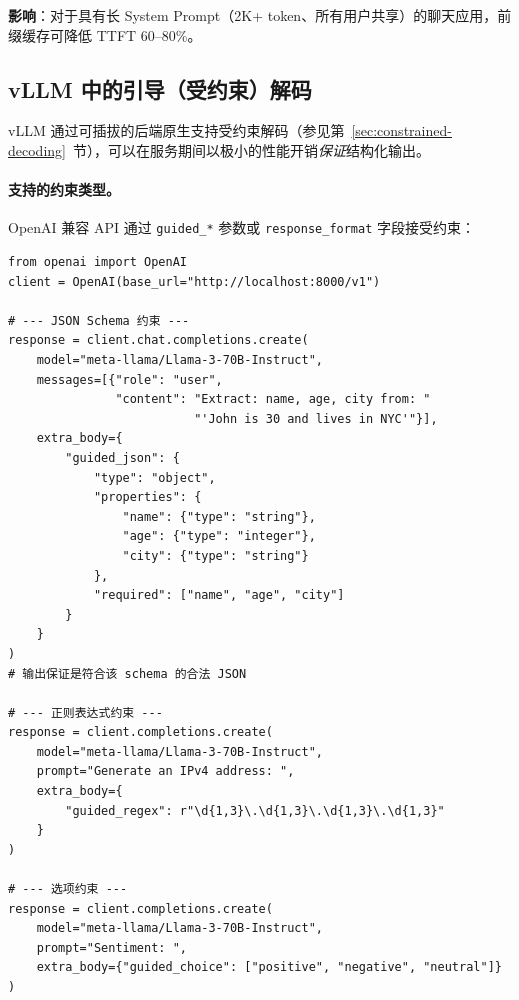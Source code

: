 \textbf{影响}：对于具有长 System Prompt（2K+ token、所有用户共享）的聊天应用，前缀缓存可降低 TTFT 60--80\%。

\subsection{vLLM 中的引导（受约束）解码}
\label{sec:vllm-guided-decoding}

vLLM 通过可插拔的后端原生支持受约束解码（参见第~\ref{sec:constrained-decoding}~节），可以在服务期间以极小的性能开销\emph{保证}结构化输出。

\paragraph{支持的约束类型。}
\label{supported-constraint-types.}

OpenAI 兼容 API 通过 \texttt{guided\_*} 参数或 \texttt{response\_format} 字段接受约束：

\begin{lstlisting}[style=pythonstyle]
from openai import OpenAI
client = OpenAI(base_url="http://localhost:8000/v1")

# --- JSON Schema 约束 ---
response = client.chat.completions.create(
    model="meta-llama/Llama-3-70B-Instruct",
    messages=[{"role": "user",
               "content": "Extract: name, age, city from: "
                          "'John is 30 and lives in NYC'"}],
    extra_body={
        "guided_json": {
            "type": "object",
            "properties": {
                "name": {"type": "string"},
                "age": {"type": "integer"},
                "city": {"type": "string"}
            },
            "required": ["name", "age", "city"]
        }
    }
)
# 输出保证是符合该 schema 的合法 JSON

# --- 正则表达式约束 ---
response = client.completions.create(
    model="meta-llama/Llama-3-70B-Instruct",
    prompt="Generate an IPv4 address: ",
    extra_body={
        "guided_regex": r"\d{1,3}\.\d{1,3}\.\d{1,3}\.\d{1,3}"
    }
)

# --- 选项约束 ---
response = client.completions.create(
    model="meta-llama/Llama-3-70B-Instruct",
    prompt="Sentiment: ",
    extra_body={"guided_choice": ["positive", "negative", "neutral"]}
)
\end{lstlisting}

